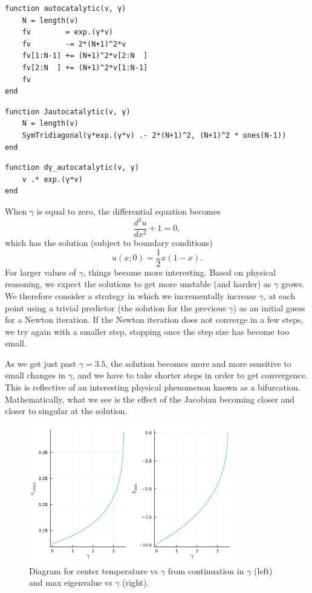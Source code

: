 \documentclass[12pt, leqno]{article} %
\begin{document}
\begin{verbatim}
function autocatalytic(v, γ)
    N = length(v)
    fv        = exp.(γ*v)
    fv        -= 2*(N+1)^2*v
    fv[1:N-1] += (N+1)^2*v[2:N  ]
    fv[2:N  ] += (N+1)^2*v[1:N-1]
    fv
end
\end{verbatim}

\begin{verbatim}
function Jautocatalytic(v, γ)
    N = length(v)
    SymTridiagonal(γ*exp.(γ*v) .- 2*(N+1)^2, (N+1)^2 * ones(N-1))
end
\end{verbatim}

\begin{verbatim}
function dγ_autocatalytic(v, γ)
    v .* exp.(γ*v)
end
\end{verbatim}

When \(\gamma\) is equal to zero, the differential equation becomes
\[\frac{d^2 u}{dx^2} + 1 = 0,\] which has the solution (subject to
boundary conditions) \[u(x; 0) = \frac{1}{2} x(1-x).\] For larger values
of \(\gamma\), things become more interesting. Based on physical
reasoning, we expect the solutions to get more unstable (and harder) as
\(\gamma\) grows. We therefore consider a strategy in which we
incrementally increase \(\gamma\), at each point using a trivial
predictor (the solution for the previous \(\gamma\)) as an initial guess
for a Newton iteration. If the Newton iteration does not converge in a
few steps, we try again with a smaller step, stopping once the step size
has become too small.

As we get just past \(\gamma = 3.5\), the solution becomes more and more
sensitive to small changes in \(\gamma\), and we have to take shorter
steps in order to get convergence. This is reflective of an interesting
physical phenomenon known as a bifurcation. Mathematically, what we see
is the effect of the Jacobian becoming closer and closer to singular at
the solution.

\begin{figure}
\begin{center}
  \includegraphics[width=0.8\textwidth]{fig/2023-04-21-bif0.pdf}
\end{center}
\caption{Diagram for center temperature vs $\gamma$ from 
  continuation in $\gamma$ (left) and max eigenvalue vs $\gamma$ (right).}
\label{fig:bif0}
\end{figure}
\end{document}
